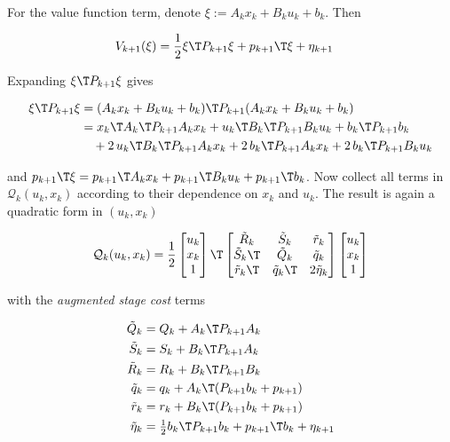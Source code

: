 For the value function term, denote $\xi := A_k x_k + B_k u_k + b_k$.
Then

\begin{align*}
V_{k+1}(\xi) &= \frac{1}{2} \xi\T P_{k+1} \xi + p_{k+1}\T \xi + \eta_{k+1}
\end{align*}

Expanding $\xi\T P_{k+1} \xi$ gives

\begin{align*}
\xi\T P_{k+1} \xi &= (A_k x_k + B_k u_k + b_k)\T P_{k+1} (A_k x_k + B_k u_k + b_k) \\
&= x_k\T A_k\T P_{k+1} A_k x_k + u_k\T B_k\T P_{k+1} B_k u_k + b_k\T P_{k+1} b_k \\
&\quad + 2\, u_k\T B_k\T P_{k+1} A_k x_k + 2\, b_k\T P_{k+1} A_k x_k + 2\, b_k\T P_{k+1} B_k u_k
\end{align*}

and $p_{k+1}\T \xi = p_{k+1}\T A_k x_k + p_{k+1}\T B_k u_k + p_{k+1}\T b_k$.
Now collect all terms in $\mathcal{Q}_k(u_k, x_k)$ according to their dependence on $x_k$ and $u_k$.
The result is again a quadratic form in $(u_k, x_k)$

\[
\mathcal{Q}_k(u_k, x_k) = \frac{1}{2}
\begin{bmatrix} u_k \\ x_k \\ 1 \end{bmatrix}\T
\begin{bmatrix}
    \tilde{R}_k   & \tilde{S}_k  & \tilde{r}_k \\
    \tilde{S}_k\T & \tilde{Q}_k  & \tilde{q}_k \\
    \tilde{r}_k\T & \tilde{q}_k\T & 2\tilde{\eta}_k
\end{bmatrix}
\begin{bmatrix} u_k \\ x_k \\ 1 \end{bmatrix}
\]

with the \textit{augmented stage cost} terms

\begin{align}
\tilde{Q}_k &= Q_k + A_k\T P_{k+1} A_k \label{eq:Qtilde} \\
\tilde{S}_k &= S_k + B_k\T P_{k+1} A_k \label{eq:Stilde} \\
\tilde{R}_k &= R_k + B_k\T P_{k+1} B_k \label{eq:Rtilde} \\
\tilde{q}_k &= q_k + A_k\T (P_{k+1} b_k + p_{k+1}) \label{eq:qtilde} \\
\tilde{r}_k &= r_k + B_k\T (P_{k+1} b_k + p_{k+1}) \label{eq:rtilde} \\
\tilde{\eta}_k &= \tfrac{1}{2} b_k\T P_{k+1} b_k + p_{k+1}\T b_k + \eta_{k+1} \label{eq:etatilde}
\end{align}


